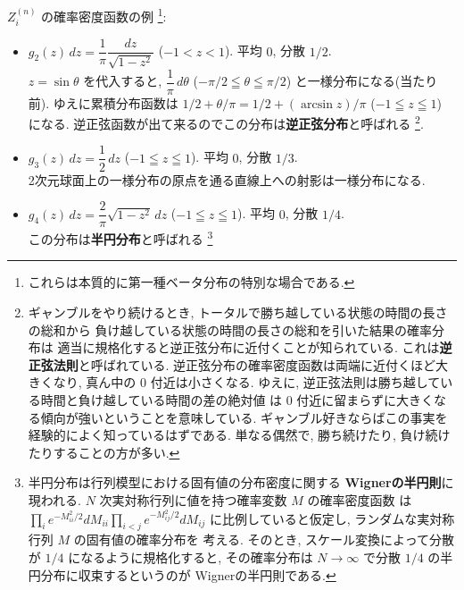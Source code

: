 \documentclass[12pt,twoside]{jarticle}
\theoremstyle{jplain}
\theoremstyle{jplain}
\theoremstyle{jplain}
\numberwithin{theorem}{section}
\numberwithin{equation}{section}
\numberwithin{figure}{section}
\numberwithin{table}{section}
\begin{document}
$Z^{(n)}_i$ の確率密度函数の例%
\footnote{これらは本質的に第一種ベータ分布の特別な場合である.}:
\begin{itemize}

\item $g_2(z)\,dz = \dfrac{1}{\pi}\dfrac{dz}{\sqrt{1-z^2}}$ \;\;\;\quad ($-1<z<1$).
\qquad 平均 $0$, 分散 $1/2$.
\\[\smallskipamount]
$z=\sin\theta$ を代入すると,
$\dfrac{1}{\pi}\,d\theta$ ($-\pi/2\leqq\theta\leqq\pi/2$) と一様分布になる(当たり前).
ゆえに累積分布函数は $1/2+\theta/\pi=1/2+(\arcsin z)/\pi$ ($-1\leqq z\leqq 1$) になる.
逆正弦函数が出て来るのでこの分布は{\bf 逆正弦分布}と呼ばれる%
\footnote{\label{fn:arcsin}%
ギャンブルをやり続けるとき, 
トータルで勝ち越している状態の時間の長さの総和から
負け越している状態の時間の長さの総和を引いた結果の確率分布は
適当に規格化すると逆正弦分布に近付くことが知られている.
これは{\bf 逆正弦法則}と呼ばれている.
逆正弦分布の確率密度函数は両端に近付くほど大きくなり, 
真ん中の $0$ 付近は小さくなる. 
ゆえに, 逆正弦法則は勝ち越している時間と負け越している時間の差の絶対値
は $0$ 付近に留まらずに大きくなる傾向が強いということを意味している.
ギャンブル好きならばこの事実を経験的によく知っているはずである.
単なる偶然で, 勝ち続けたり, 負け続けたりすることの方が多い.
}.

\item $g_3(z)\,dz = \dfrac{1}{2}\,dz$ \;\;\qquad\qquad ($-1\leqq z\leqq 1$). 
\qquad 平均 $0$, 分散 $1/3$.
\\[\smallskipamount]
2次元球面上の一様分布の原点を通る直線上への射影は一様分布になる.

\item $g_4(z)\,dz = \dfrac{2}{\pi}\sqrt{1-z^2}\,dz$ \quad ($-1\leqq z\leqq 1$).
\qquad 平均 $0$, 分散 $1/4$.
\\[\smallskipamount]
この分布は{\bf 半円分布}と呼ばれる%
\footnote{\label{fn:Wigner}%
半円分布は行列模型における固有値の分布密度に関する
{\bf Wignerの半円則}に現われる.
$N$ 次実対称行列に値を持つ確率変数 $M$ の確率密度函数
は $\prod_i e^{-M_{ii}^2/2}dM_{ii} \prod_{i<j}e^{-M_{ij}^2/2}dM_{ij}$
に比例していると仮定し, ランダムな実対称行列 $M$ の固有値の確率分布を
考える. そのとき, スケール変換によって分散が $1/4$ になるように規格化すると, 
その確率分布は $N\to\infty$ で分散 $1/4$ の半円分布に収束するというのが
Wignerの半円則である.

}
\end{itemize}
\end{document}
